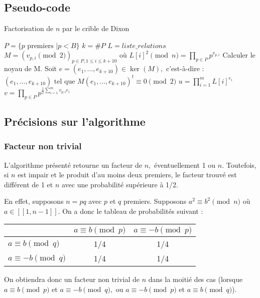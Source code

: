 \documentclass[french, 12pt, titlepage]{article}
\DeclareMathOperator{\pgcd}{pgcd}
\begin{document}
\subsection{Pseudo-code}

\begin{algorithm}
\caption{Factorisation de $n$ par le crible de Dixon}
\BlankLine
$P = \{p \text{ premiers } | p < B\}$\;
$k = \#P$\;
$L = liste\_relations$\;
$M = (v_{p, i} \pmod 2)_{p \in P, 1 \leq i \leq k + 10} \text{ où } L[i]^2 \pmod n = \prod\limits_{p \in P}p^{v_{p,i}}$\;
Calculer le noyau de M. Soit $e = (e_1, ..., e_{k + 10}) \in \ker(M),$ c'est-à-dire :\\
$(e_1, ..., e_{k + 10}) \text{ tel que } M(e_1, ..., e_{k + 10})^t \equiv 0 \pmod 2$\;
$u = \prod\limits_{i = 1}^m L[i]^{e_i}$\;
$v = \prod\limits_{p \in P} p^{\frac{1}{2} \sum\limits_{i=1}^m v_{p, i}e_i}$\;
\Return{$\pgcd(u - v, n)$}
\end{algorithm}

\subsection{Précisions sur l'algorithme}

\subsubsection{Facteur non trivial}

L'algorithme présenté retourne un facteur de $n,$ éventuellement 1 ou
$n.$ Toutefois, si $n$ est impair et le produit d'au moins deux
premiers, le facteur trouvé est différent de 1 et $n$ avec une
probabilité supérieure à 1/2. 

En effet, supposons $n = pq$ avec $p$ et $q$ premiers. Supposons $a^2 \equiv b^2 \pmod n$
où $a \in [\![1, n-1]\!].$ On a donc le tableau de probabilités
suivant : 
\begin{center}
\begin{tabular}{l|c|c}
 & $a \equiv b \pmod p$ & $a \equiv -b \pmod p$ \\
\hline
$a \equiv b \pmod q$ & 1/4 & 1/4 \\
\hline
$a \equiv -b \pmod q$ & 1/4 & 1/4 \\
\end{tabular}
\end{center}
On obtiendra donc un facteur non trivial de $n$ dans la moitié des cas
(lorsque $a \equiv b \pmod p$ et $a \equiv -b \pmod q,$ ou $a \equiv -b \pmod p$ et $a \equiv b \pmod q$).
\end{document}
